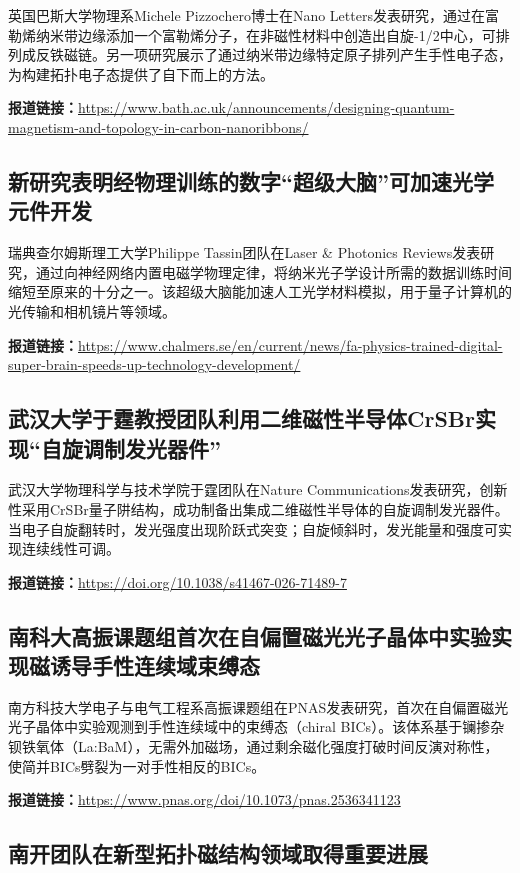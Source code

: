\documentclass[12pt,a4paper]{ctexart}
\begin{document}
英国巴斯大学物理系Michele Pizzochero博士在Nano Letters发表研究，通过在富勒烯纳米带边缘添加一个富勒烯分子，在非磁性材料中创造出自旋-1/2中心，可排列成反铁磁链。另一项研究展示了通过纳米带边缘特定原子排列产生手性电子态，为构建拓扑电子态提供了自下而上的方法。

\noindent\textbf{报道链接：}\url{https://www.bath.ac.uk/announcements/designing-quantum-magnetism-and-topology-in-carbon-nanoribbons/}

\subsection{ 新研究表明经物理训练的数字“超级大脑”可加速光学元件开发 }

瑞典查尔姆斯理工大学Philippe Tassin团队在Laser \& Photonics Reviews发表研究，通过向神经网络内置电磁学物理定律，将纳米光子学设计所需的数据训练时间缩短至原来的十分之一。该超级大脑能加速人工光学材料模拟，用于量子计算机的光传输和相机镜片等领域。

\noindent\textbf{报道链接：}\url{https://www.chalmers.se/en/current/news/fa-physics-trained-digital-super-brain-speeds-up-technology-development/}

\subsection{ 武汉大学于霆教授团队利用二维磁性半导体CrSBr实现“自旋调制发光器件” }

武汉大学物理科学与技术学院于霆团队在Nature Communications发表研究，创新性采用CrSBr量子阱结构，成功制备出集成二维磁性半导体的自旋调制发光器件。当电子自旋翻转时，发光强度出现阶跃式突变；自旋倾斜时，发光能量和强度可实现连续线性可调。

\noindent\textbf{报道链接：}\url{https://doi.org/10.1038/s41467-026-71489-7}

\subsection{ 南科大高振课题组首次在自偏置磁光光子晶体中实验实现磁诱导手性连续域束缚态 }

南方科技大学电子与电气工程系高振课题组在PNAS发表研究，首次在自偏置磁光光子晶体中实验观测到手性连续域中的束缚态（chiral BICs）。该体系基于镧掺杂钡铁氧体（La:BaM），无需外加磁场，通过剩余磁化强度打破时间反演对称性，使简并BICs劈裂为一对手性相反的BICs。

\noindent\textbf{报道链接：}\url{https://www.pnas.org/doi/10.1073/pnas.2536341123}

\subsection{ 南开团队在新型拓扑磁结构领域取得重要进展 }
\end{document}
